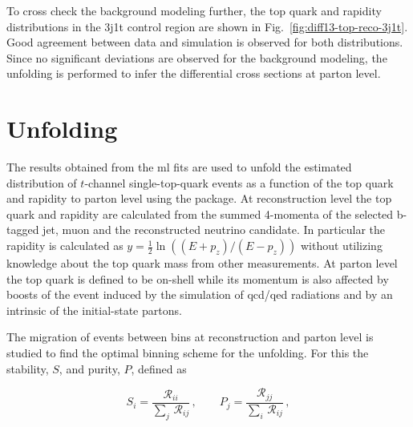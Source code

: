 To cross check the background modeling further, the top quark \pt and rapidity distributions in the 3j1t \ttbar control region are shown in Fig.~\ref{fig:diff13-top-reco-3j1t}. Good agreement between data and simulation is observed for both distributions. Since no significant deviations are observed for the background modeling, the unfolding is performed to infer the differential cross sections at parton level.


\section{Unfolding}
\label{sec:diff13-unfolding}

The results obtained from the \gls{ml} fits are used to unfold the estimated distribution of $t$-channel single-top-quark events as a function of the top quark \pt and rapidity to parton level using the \TUNFOLD package. At reconstruction level the top quark \pt and rapidity are calculated from the summed 4-momenta of the selected b-tagged jet, muon and the reconstructed neutrino candidate. In particular the rapidity is calculated as $y=\frac{1}{2}\ln((E+p_{z})/(E-p_{z}))$ without utilizing knowledge about the top quark mass from other measurements. At parton level the top quark is defined to be on-shell while its momentum is also affected by boosts of the event induced by the simulation of \gls{qcd}/\gls{qed} radiations and by an intrinsic \kt of the initial-state partons. 

The migration of events between bins at reconstruction and parton level is studied to find the optimal binning scheme for the unfolding. For this the stability, $S$, and purity, $P$, defined as 

\begin{equation}
S_{i}=\frac{\mathcal{R}_{ii}}{\sum\limits_{j}\,\mathcal{R}_{ij}}\,,\qquad P_{j}=\frac{\mathcal{R}_{jj}}{\sum\limits_{i}\,\mathcal{R}_{ij}}\,,
\end{equation}

